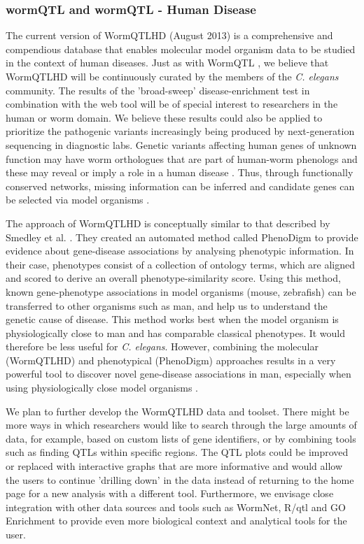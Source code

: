 \subsubsection{wormQTL and wormQTL - Human Disease}
The current version of WormQTLHD (August 2013) is a comprehensive and compendious database that 
enables molecular model organism data to be studied in the context of human diseases. Just as with 
WormQTL \cite{Snoek:2012}, we believe that WormQTLHD will be continuously curated by the members of 
the \emph{C. elegans} community. The results of the 'broad-sweep' disease-enrichment test in 
combination with the web tool will be of special interest to researchers in the human or worm 
domain. We believe these results could also be applied to prioritize the pathogenic variants 
increasingly being produced by next-generation sequencing in diagnostic labs. Genetic variants 
affecting human genes of unknown function may have worm orthologues that are part of human-worm 
phenologs and these may reveal or imply a role in a human disease \cite{Ostlund:2014}. Thus, 
through functionally conserved networks, missing information can be inferred and candidate genes 
can be selected via model organisms \cite{vanDerVelde:2014}.

The approach of WormQTLHD is conceptually similar to that described by Smedley et al. 
\cite{Smedley:2013}. They created an automated method called PhenoDigm to provide evidence about 
gene-disease associations by analysing phenotypic information. In their case, phenotypes consist of 
a collection of ontology terms, which are aligned and scored to derive an overall phenotype-similarity score. Using this 
method, known gene-phenotype associations in model organisms (mouse, zebrafish) can be transferred 
to other organisms such as man, and help us to understand the genetic cause of disease. This method 
works best when the model organism is physiologically close to man and has comparable classical 
phenotypes. It would therefore be less useful for \emph{C. elegans}. However, combining the molecular 
(WormQTLHD) and phenotypical (PhenoDigm) approaches results in a very powerful tool to discover 
novel gene-disease associations in man, especially when using physiologically close model organisms \cite{vanDerVelde:2014}.

We plan to further develop the WormQTLHD data and toolset. There might be more ways in which 
researchers would like to search through the large amounts of data, for example, based on custom 
lists of gene identifiers, or by combining tools such as finding QTLs within specific regions. 
The QTL plots could be improved or replaced with interactive graphs that are more informative and 
would allow the users to continue 'drilling down' in the data instead of returning to the home page 
for a new analysis with a different tool. Furthermore, we envisage close integration with other data 
sources and tools such as WormNet, R/qtl and GO Enrichment to provide even more biological context 
and analytical tools for the user.

